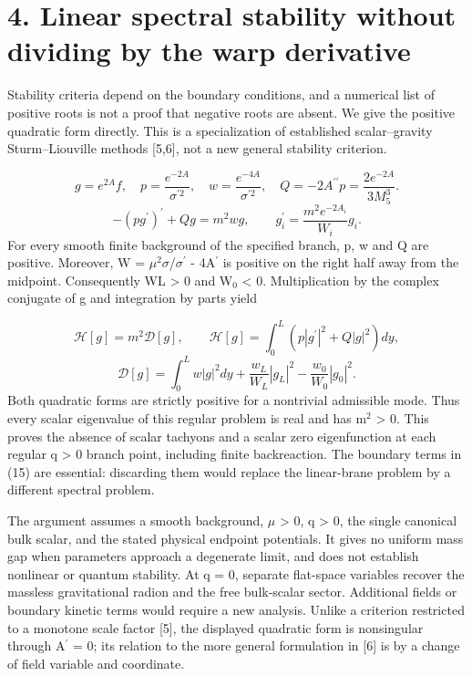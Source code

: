 \documentclass[11pt]{article}
\begin{document}
\section*{4. Linear spectral stability without dividing by the warp derivative}
Stability criteria depend on the boundary conditions, and a numerical list of positive roots is not a proof that negative roots are absent. We give the positive quadratic form directly. This is a specialization of established scalar--gravity Sturm--Liouville methods [5,6], not a new general stability criterion.

\begin{equation}
g=e^{2A}f,\quad p=\frac{e^{-2A}}{\sigma^{\prime 2}},\quad w=\frac{e^{-4A}}{\sigma^{\prime 2}},\quad Q=-2A^{\prime\prime}p=\frac{2e^{-2A}}{3M_5^3}.\tag{12}
\end{equation}
\begin{equation}
-(pg^\prime)^\prime+Qg=m^2wg,\qquad g_i^\prime=\frac{m^2e^{-2A_i}}{W_i}g_i.\tag{13}
\end{equation}
For every smooth finite background of the specified branch, p, w and Q are positive. Moreover, W = \(\mu\)\({}^2\)\(\sigma\)/\(\sigma\)\({}^\prime\) - 4A\({}^\prime\) is positive on the right half away from the midpoint. Consequently WL > 0 and W\({}_0\) < 0. Multiplication by the complex conjugate of g and integration by parts yield

\begin{equation}
\mathcal{H}[g]=m^2\mathcal{D}[g],\qquad \mathcal{H}[g]=\int_0^L(p|g^\prime|^2+Q|g|^2)dy,\tag{14}
\end{equation}
\begin{equation}
\mathcal{D}[g]=\int_0^Lw|g|^2dy+\frac{w_L}{W_L}|g_L|^2-\frac{w_0}{W_0}|g_0|^2.\tag{15}
\end{equation}
Both quadratic forms are strictly positive for a nontrivial admissible mode. Thus every scalar eigenvalue of this regular problem is real and has m\({}^2\) > 0. This proves the absence of scalar tachyons and a scalar zero eigenfunction at each regular q > 0 branch point, including finite backreaction. The boundary terms in (15) are essential: discarding them would replace the linear-brane problem by a different spectral problem.

The argument assumes a smooth background, \(\mu\) > 0, q > 0, the single canonical bulk scalar, and the stated physical endpoint potentials. It gives no uniform mass gap when parameters approach a degenerate limit, and does not establish nonlinear or quantum stability. At q = 0, separate flat-space variables recover the massless gravitational radion and the free bulk-scalar sector. Additional fields or boundary kinetic terms would require a new analysis. Unlike a criterion restricted to a monotone scale factor [5], the displayed quadratic form is nonsingular through A\({}^\prime\) = 0; its relation to the more general formulation in [6] is by a change of field variable and coordinate.
\end{document}
